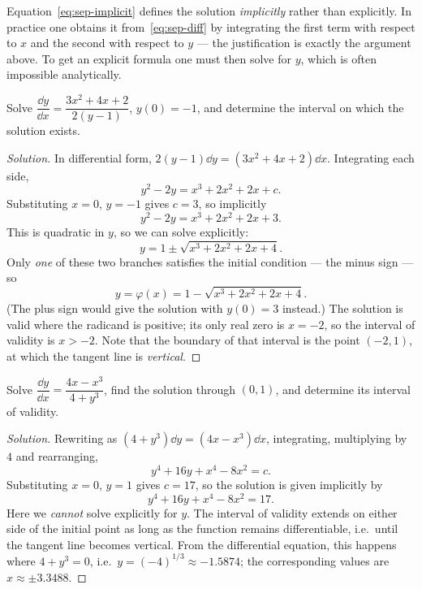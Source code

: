 \begin{remark}
	Equation~\eqref{eq:sep-implicit} defines the solution \emph{implicitly} rather than
	explicitly. In practice one obtains it from~\eqref{eq:sep-diff} by integrating the
	first term with respect to \(x\) and the second with respect to \(y\) --- the
	justification is exactly the argument above. To get an explicit formula one must then
	solve for \(y\), which is often impossible analytically.
\end{remark}

\begin{eg}\label{eg:explicit-quadratic}
	Solve \(\dfrac{\dd y}{\dd x} = \dfrac{3x^2 + 4x + 2}{2(y-1)}\), \(y(0) = -1\), and
	determine the interval on which the solution exists.
\end{eg}

\begin{proof}[Solution]
	In differential form, \(2(y-1)\dd y = (3x^2 + 4x + 2)\dd x\). Integrating each side,
	\[
		y^2 - 2y = x^3 + 2x^2 + 2x + c.
	\]
	Substituting \(x = 0\), \(y = -1\) gives \(c = 3\), so implicitly
	\[
		y^2 - 2y = x^3 + 2x^2 + 2x + 3.
	\]
	This is quadratic in \(y\), so we can solve explicitly:
	\[
		y = 1 \pm \sqrt{x^3 + 2x^2 + 2x + 4}.
	\]
	Only \emph{one} of these two branches satisfies the initial condition --- the minus
	sign --- so
	\[
		y = \varphi(x) = 1 - \sqrt{x^3 + 2x^2 + 2x + 4}.
	\]
	(The plus sign would give the solution with \(y(0) = 3\) instead.) The solution is
	valid where the radicand is positive; its only real zero is \(x = -2\), so the
	interval of validity is \(x > -2\). Note that the boundary of that interval is the
	point \((-2, 1)\), at which the tangent line is \emph{vertical}.
\end{proof}

\begin{eg}
	Solve \(\dfrac{\dd y}{\dd x} = \dfrac{4x - x^3}{4 + y^3}\), find the solution through
	\((0,1)\), and determine its interval of validity.
\end{eg}

\begin{proof}[Solution]
	Rewriting as \((4 + y^3)\dd y = (4x - x^3)\dd x\), integrating, multiplying by \(4\)
	and rearranging,
	\[
		y^4 + 16y + x^4 - 8x^2 = c.
	\]
	Substituting \(x = 0\), \(y = 1\) gives \(c = 17\), so the solution is given
	implicitly by
	\[
		y^4 + 16y + x^4 - 8x^2 = 17.
	\]
	Here we \emph{cannot} solve explicitly for \(y\). The interval of validity extends on
	either side of the initial point as long as the function remains differentiable, i.e.\
	until the tangent line becomes vertical. From the differential equation, this happens
	where \(4 + y^3 = 0\), i.e.\ \(y = (-4)^{1/3} \approx -1.5874\); the corresponding
	values are \(x \approx \pm 3.3488\).
\end{proof}

